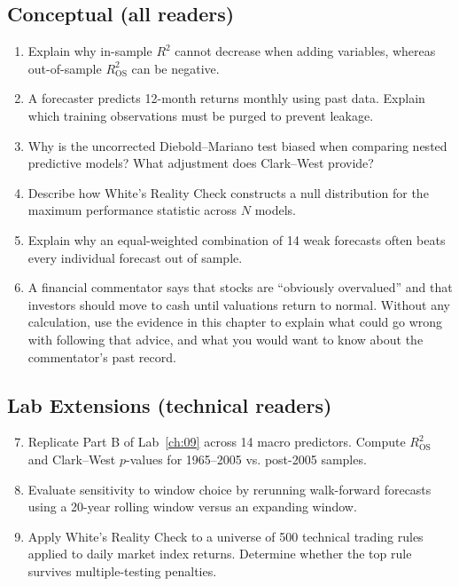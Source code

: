 \subsection*{Conceptual (all readers)}
\begin{enumerate}
  \item Explain why in-sample $R^2$ cannot decrease when adding variables, whereas out-of-sample $R^2_{\text{OS}}$ can be negative.
  \item A forecaster predicts 12-month returns monthly using past data. Explain which training observations must be purged to prevent leakage.
  \item Why is the uncorrected Diebold--Mariano test biased when comparing nested predictive models? What adjustment does Clark--West provide?
  \item Describe how White's Reality Check constructs a null distribution for the maximum performance statistic across $N$ models.
  \item Explain why an equal-weighted combination of 14 weak forecasts often beats every individual forecast out of sample.
  \item A financial commentator says that stocks are ``obviously overvalued'' and that investors should move to cash until valuations return to normal. Without any calculation, use the evidence in this chapter to explain what could go wrong with following that advice, and what you would want to know about the commentator's past record.
\end{enumerate}

\subsection*{Lab Extensions (technical readers)}
\begin{enumerate}
  \setcounter{enumi}{6}
  \item Replicate Part B of Lab~\ref{ch:09} across 14 macro predictors. Compute $R^2_{\text{OS}}$ and Clark--West $p$-values for 1965--2005 vs. post-2005 samples.
  \item Evaluate sensitivity to window choice by rerunning walk-forward forecasts using a 20-year rolling window versus an expanding window.
  \item Apply White's Reality Check to a universe of 500 technical trading rules applied to daily market index returns. Determine whether the top rule survives multiple-testing penalties.
\end{enumerate}
